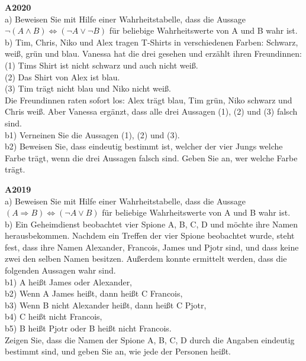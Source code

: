 \documentclass[landscape,twocolumn,a4paper]{article}
\begin{document}
\bigskip 

\textbf{A2020} \\

a) Beweisen Sie mit Hilfe einer Wahrheitstabelle, dass die Aussage $ \lnot(A \land B) \Leftrightarrow (\lnot A \lor \lnot B)$ für beliebige Wahrheitswerte von A und B wahr ist. \\

b) Tim, Chris, Niko und Alex tragen T-Shirts in verschiedenen Farben: Schwarz, weiß, grün und
blau. Vanessa hat die drei gesehen und erzählt ihren Freundinnen: \\
(1) Tims Shirt ist nicht schwarz und auch nicht weiß. \\
(2) Das Shirt von Alex ist blau. \\
(3) Tim trägt nicht blau und Niko nicht weiß. \\
Die Freundinnen raten sofort los: Alex trägt blau, Tim grün, Niko schwarz und Chris weiß.
Aber Vanessa ergänzt, dass alle drei Aussagen (1), (2) und (3) falsch sind. \\

b1) Verneinen Sie die Aussagen (1), (2) und (3). \\
b2) Beweisen Sie, dass eindeutig bestimmt ist, welcher der vier Jungs welche Farbe trägt,
wenn die drei Aussagen falsch sind. Geben Sie an, wer welche Farbe trägt.
\bigskip 

\newpage

\textbf{A2019} \\

a) Beweisen Sie mit Hilfe einer Wahrheitstabelle, 
dass die Aussage $(A \Rightarrow B) \Leftrightarrow (\lnot A \lor B) $
für beliebige Wahrheitswerte von A und B wahr ist. \\

b) Ein Geheimdienst beobachtet vier Spione A, B, C, D und möchte ihre Namen herausbekommen.
Nachdem ein Treffen der vier Spione beobachtet wurde, steht fest, dass ihre Namen
Alexander, Francois, James und Pjotr sind, und dass keine zwei den selben Namen besitzen.
Außerdem konnte ermittelt werden, dass die folgenden Aussagen wahr sind. \\

b1) A heißt James oder Alexander, \\
b2) Wenn A James heißt, dann heißt C Francois, \\
b3) Wenn B nicht Alexander heißt, dann heißt C Pjotr, \\
b4) C heißt nicht Francois, \\
b5) B heißt Pjotr oder B heißt nicht Francois. \\
Zeigen Sie, dass die Namen der Spione A, B, C, D durch
die Angaben eindeutig bestimmt
sind, und geben Sie an, wie jede der Personen heißt.
\bigskip 
\end{document}
